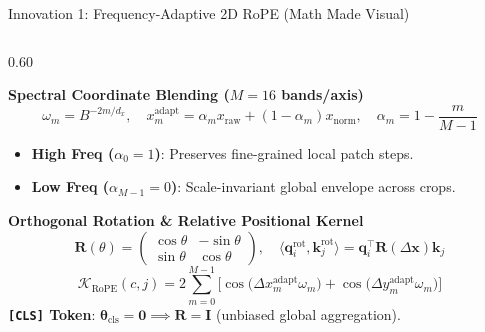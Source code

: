 \documentclass[aspectratio=169,10pt]{beamer}
\begin{document}
\begin{frame}{Innovation 1: Frequency-Adaptive 2D RoPE (Math Made Visual)}
\begin{columns}[c]
    \begin{column}{0.60\textwidth}
        \begin{block}{\textbf{Spectral Coordinate Blending ($M=16$ bands/axis)}}
            \scriptsize
            \vspace{-0.3em}
            \[
                \omega_m = B^{-2m / d_x}, \quad x_m^{\text{adapt}} = \alpha_m x_{\text{raw}} + (1 - \alpha_m) x_{\text{norm}}, \quad \alpha_m = 1 - \frac{m}{M-1}
            \]
            \vspace{-0.5em}
            \begin{itemize}\setlength{\itemsep}{1pt}
                \item \textbf{High Freq ($\alpha_0 = 1$)}: Preserves fine-grained local patch steps.
                \item \textbf{Low Freq ($\alpha_{M-1} = 0$)}: Scale-invariant global envelope across crops.
            \end{itemize}
        \end{block}

        \vspace{-0.2em}
        \begin{exampleblock}{\textbf{Orthogonal Rotation \& Relative Positional Kernel}}
            \scriptsize
            \vspace{-0.3em}
            \[
                \mathbf{R}(\theta) = \begin{pmatrix} \cos\theta & -\sin\theta \\ \sin\theta & \cos\theta \end{pmatrix}, \quad \langle \mathbf{q}_i^{\text{rot}}, \mathbf{k}_j^{\text{rot}} \rangle = \mathbf{q}_i^\top \mathbf{R}(\Delta \mathbf{x}) \mathbf{k}_j
            \]
            \vspace{-0.4em}
            \[
                \mathcal{K}_{\text{RoPE}}(c, j) = 2 \sum_{m=0}^{M-1} \Big[\cos\!\big(\Delta x_m^{\text{adapt}}\omega_m\big) + \cos\!\big(\Delta y_m^{\text{adapt}}\omega_m\big)\Big]
            \]
            \vspace{-0.4em}
            \textbf{\texttt{[CLS]} Token}: $\boldsymbol{\theta}_{\text{cls}} = \mathbf{0} \implies \mathbf{R}=\mathbf{I}$ (unbiased global aggregation).
        \end{exampleblock}
    \end{column}
\end{columns}
\end{frame}
\end{document}
